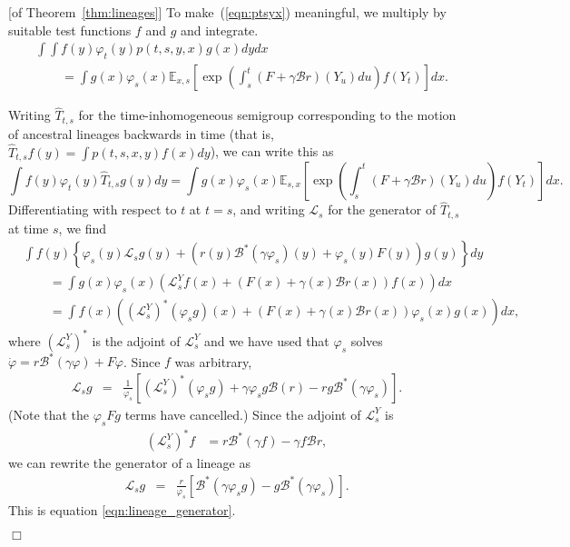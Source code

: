 \documentclass[12pt]{article}
\newenvironment {proof}{{\noindent\bf Proof }}{\hfill $\Box$ \medskip}
\def \hat{\widehat}
\newcommand{\IE}{\mathbb E}
\newcommand{\DG}{\mathcal{B}}  %
\newcommand{\Lgen}{\mathcal{L}}    %
\numberwithin{equation}{section}
\begin{document}
\begin{proof}[of Theorem~\ref{thm:lineages}]
To make~(\ref{eqn:ptsyx}) meaningful, we multiply by suitable test functions
$f$ and $g$ and integrate.
\begin{align*}
&\int \int f(y) \varphi_t(y) p(t,s,y,x) g(x) dy dx \\
&\qquad =
\int g(x) \varphi_s(x)
\IE_{x,s}\left[
    \exp\left(
        \int_s^t(F+\gamma\DG r)(Y_u)du
    \right)f(Y_t)
\right] dx .
\end{align*}

Writing $\hat{T}_{t,s}$ for the time-inhomogeneous semigroup
corresponding to the motion of ancestral lineages backwards in time
(that is, $\hat{T}_{t,s} f(y) = \int p(t,s,x,y) f(x) dy$),
we can write this as 
$$
    \int f(y)\varphi_t(y)\hat{T}_{t,s}g(y)dy
    =
    \int g(x) \varphi_s(x)
        \IE_{s,x} \left[
            \exp\left(
                \int_s^t(F+\gamma\DG r)(Y_u)du
            \right)f(Y_t)
        \right]dx.
$$
Differentiating with respect to $t$ at $t=s$, and writing 
$\Lgen_s$ for the generator of $\hat{T}_{t,s}$ at time $s$, we find
\begin{align*}
&
    \int f(y) \left\{
        \varphi_s(y) \Lgen_s g(y)
        + \left(
            r(y) \DG^*(\gamma \varphi_s)(y) + \varphi_s(y) F(y)
        \right) g(y)
    \right\} dy \\
&\qquad =
    \int g(x) \varphi_s(x) \left(
        {\mathcal L}^Y_s f(x) + (F(x)+\gamma(x) \DG r(x)) f(x)
    \right) dx \\
&\qquad =
    \int f(x) \left(
        ({\mathcal L}^Y_s)^* (\varphi_s g)(x) + (F(x) + \gamma(x) \DG r(x)) \varphi_s(x) g(x)
    \right) dx ,
\end{align*}
where $({\mathcal L}^Y_s)^*$ is the adjoint of ${\mathcal L}^Y_s$
and we have used that $\varphi_s$ solves $\dot \varphi = r \DG^*(\gamma \varphi) + F \varphi$.
Since $f$ was arbitrary,
\begin{eqnarray*}
\Lgen_s g
    &=&
    \frac{1}{\varphi_s} \left[
        ({\mathcal L}^Y_s)^* (\varphi_s g)
        + \gamma \varphi_s g \DG(r)
        - r g \DG^*(\gamma \varphi_s)
    \right] .
\end{eqnarray*}
(Note that the $\varphi_s F g$ terms have cancelled.)
Since the adjoint of ${\mathcal L}^Y_s$ is
\begin{align*}
    ({\mathcal L}^Y_s)^* f
    &=
    r \DG^* (\gamma f) - \gamma f \DG r ,
\end{align*}
we can rewrite the generator of a lineage as 
\begin{eqnarray*}
\Lgen_s g
    &=&
    \frac{r}{\varphi_s} \left[
        \DG^* (\gamma \varphi_s g)
        - g \DG^*(\gamma \varphi_s)
    \right] .
\end{eqnarray*}
This is equation \eqref{eqn:lineage_generator}.



\end{proof}
\end{document}
